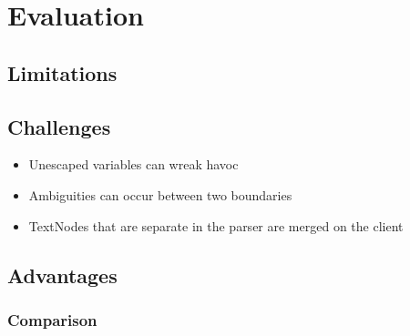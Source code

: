 \chapter{Evaluation}
\label{chap:eval}
\section{Limitations}














\section{Challenges}
\begin{itemize}
\item Unescaped variables can wreak havoc
\item Ambiguities can occur between two boundaries
\item TextNodes that are separate in the parser are merged on the client
\end{itemize}
\section{Advantages}
\subsection{Comparison}
